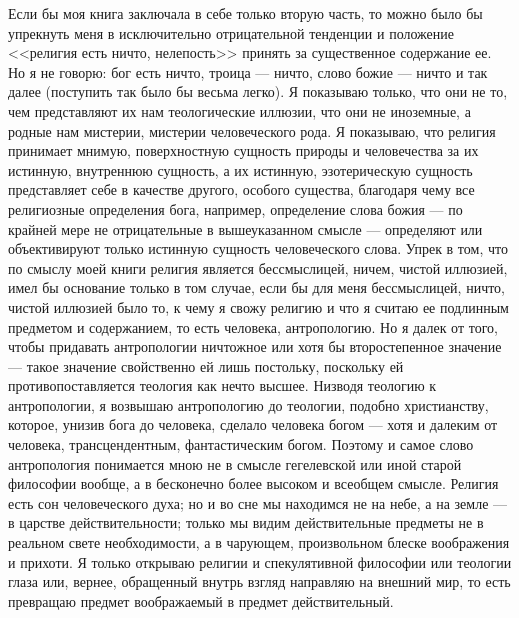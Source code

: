 \documentclass[12pt,oneside]{book}
\begin{document}
Если бы моя книга заключала в себе только вторую часть, то можно было бы упрекнуть меня в исключительно отрицательной тенденции и положение <<религия есть ничто, нелепость>> принять за существенное содержание ее. Но я не говорю: бог есть ничто, троица --- ничто, слово божие --- ничто и так далее (поступить так было бы весьма легко). Я показываю только, что они не то, чем представляют их нам теологические иллюзии, что они не иноземные, а родные нам мистерии, мистерии человеческого рода. Я показываю, что религия принимает мнимую, поверхностную сущность природы и человечества за их истинную, внутреннюю сущность, а их истинную, эзотерическую сущность представляет себе в качестве другого, особого существа, благодаря чему все религиозные определения бога, например, определение слова божия --- по крайней мере не отрицательные в вышеуказанном смысле --- определяют или объективируют только истинную сущность человеческого слова. Упрек в том, что по смыслу моей книги религия является бессмыслицей, ничем, чистой иллюзией, имел бы основание только в том случае, если бы для меня бессмыслицей, ничто, чистой иллюзией было то, к чему я свожу религию и что я считаю ее подлинным предметом и содержанием, то есть человека, антропологию. Но я далек от того, чтобы придавать антропологии ничтожное или хотя бы второстепенное значение --- такое значение свойственно ей лишь постольку, поскольку ей противопоставляется теология как нечто высшее. Низводя теологию к антропологии, я возвышаю антропологию до теологии, подобно христианству, которое, унизив бога до человека, сделало человека богом --- хотя и далеким от человека, трансцендентным, фантастическим богом. Поэтому и самое слово антропология понимается мною не в смысле гегелевской или иной старой философии вообще, а в бесконечно более высоком и всеобщем смысле.
Религия есть сон человеческого духа; но и во сне мы находимся не на небе, а на земле --- в царстве действительности; только мы видим действительные предметы не в реальном свете необходимости, а в чарующем, произвольном блеске воображения и прихоти. Я только открываю религии и спекулятивной философии или теологии глаза или, вернее, обращенный внутрь взгляд направляю на внешний мир, то есть превращаю предмет воображаемый в предмет действительный.
\end{document}
